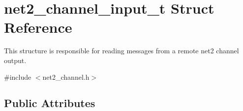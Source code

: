 \hypertarget{structnet2__channel__input__t}{}\section{net2\+\_\+channel\+\_\+input\+\_\+t Struct Reference}
\label{structnet2__channel__input__t}


This structure is responsible for reading messages from a remote net2 channel output.  




{\ttfamily \#include $<$net2\+\_\+channel.\+h$>$}

\subsection*{Public Attributes}
